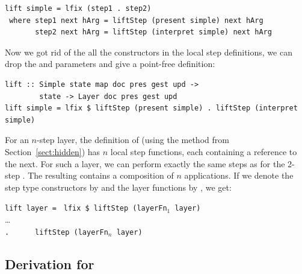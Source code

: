 \documentclass{llncs}
\begin{document}
\begin{small}%
\begin{verbatim}
lift simple = lfix (step1 . step2)
 where step1 next hArg = liftStep (present simple) next hArg
       step2 next hArg = liftStep (interpret simple) next hArg
\end{verbatim}
\end{small}

Now we got rid of the all the constructors in the local step definitions, we can drop the  and  parameters and give a point-free definition:

\begin{small} %
\begin{verbatim}
lift :: Simple state map doc pres gest upd ->
        state -> Layer doc pres gest upd
lift simple = lfix $ liftStep (present simple) . liftStep (interpret simple)
\end{verbatim}%
\end{small}



For an $n$-step layer, the definition of  (using the method from Section~\ref{sect:hidden}) has $n$ local step functions, each  containing a reference to the next. \bc {} \ec For such a layer, we can perform exactly the same steps as for the 2-step . The resulting  contains a composition of $n$  applications. If we denote the step type constructors by  and the layer functions by , we get:

\begin{small}
\begin{tabbing}
{\tt lift layer = } \= {\tt lfix \$ liftStep (layerFn$_1$ layer)} \\
                    \>       \dots \\
                    \> {\tt .~~~~~~liftStep (layerFn$_n$ layer)}\\
\end{tabbing}%
\end{small}



%																
\subsection{Derivation for } \label{subsubsectcombine}
\end{document}
